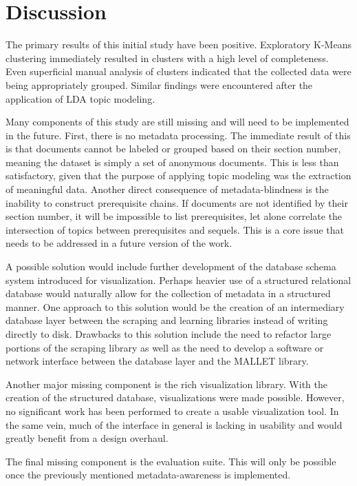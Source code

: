 \section{Discussion}
\label{sec:discussion}


The primary results of this initial study have been positive. Exploratory
K-Means clustering immediately resulted in clusters with a high level of
completeness. Even superficial manual analysis of clusters indicated that
the collected data were being appropriately grouped. Similar findings were
encountered after the application of LDA topic modeling.


{\color{red}

Many components of this study are still missing and will need to be
implemented in the future. First, there is no metadata processing. The
immediate result of this is that documents cannot be labeled or grouped
based on their section number, meaning the dataset is simply a set of
anonymous documents. This is less than satisfactory, given that the purpose
of applying topic modeling was the extraction of meaningful data. Another
direct consequence of metadata-blindness is the inability to construct
prerequisite chains. If documents are not identified by their section
number, it will be impossible to list prerequisites, let alone correlate
the intersection of topics between prerequisites and sequels. This is a
core issue that needs to be addressed in a future version of the work.

A possible solution would include further development of the database
schema system introduced for visualization. Perhaps heavier use of a
structured relational database would naturally allow for the collection of
metadata in a structured manner. One approach to this solution would be the
creation of an intermediary database layer between the scraping and
learning libraries instead of writing directly to disk. Drawbacks to this
solution include the need to refactor large portions of the scraping
library as well as the need to develop a software or network interface
between the database layer and the MALLET library.

Another major missing component is the rich visualization library. With the
creation of the structured database, visualizations were made possible.
However, no significant work has been performed to create a usable
visualization tool. In the same vein, much of the interface in general is
lacking in usability and would greatly benefit from a design overhaul.

The final missing component is the evaluation suite. This will only be
possible once the previously mentioned metadata-awareness is implemented.

}


